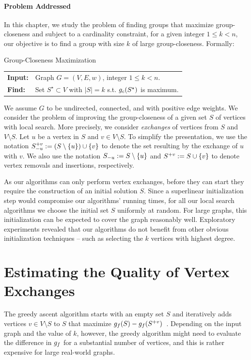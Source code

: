 \paragraph{Problem Addressed}
%
In this chapter, we study the problem of finding groups that maximize
group-closeness and subject to a cardinality constraint, \ie for a given
integer $1 \le k < n$, our objective is to find a group with size $k$ of large
group-closeness. Formally:

\begin{cproblem}{Group-Closeness Maximization}
\begin{tabular}{ll}
\textbf{Input:} & Graph $G = (V, E, w)$, integer $1 \le k < n$.\\
\textbf{Find:} & Set $S^\star \subset V$ with $|S| = k$ s.t. $g_c(S^\star)$ is maximum.
\end{tabular}
\end{cproblem}

We assume $G$ to be undirected, connected, and with positive edge weights.
We consider the problem of improving the group-closeness of a given
set $S$ of vertices with local search. More precisely, we consider
\emph{exchanges} of vertices from $S$ and $V \setminus S$. Let $u$ be a vertex
in $S$ and $v \in V \setminus S$. To simplify the presentation, we use the
notation $\Suv := (S \setminus \set{u}) \cup \set{v}$ to denote the set
resulting by the exchange of $u$ with $v$. We also use the
notation $\Su := S \setminus \set{u}$ and $\Sv := S \cup \set{v}$ to denote
vertex removals and insertions, respectively.

As our algorithms can only perform vertex exchanges, before they can start
they require the construction of an initial solution $S$. Since a superlinear
initialization step would compromise our algorithms' running times, for all our
local search algorithms we choose the initial set $S$ uniformly at random.
%
For large graphs, this initialization can be expected to cover the graph
reasonably well. Exploratory experiments revealed that our algorithms do not
benefit from other obvious initialization techniques -- such as selecting the
$k$ vertices with highest degree.


\section{Estimating the Quality of Vertex Exchanges}
\label{sec:lsh-gc-quality-vertex-exchanges}
%
The greedy ascent algorithm starts with an empty set $S$ and iteratively adds
vertices $v \in V \setminus S$ to $S$ that maximize
$g_f(S) - g_f(S^{+v})$~\cite{DBLP:conf/alenex/BergaminiGM18}.
Depending on the input graph and the value of $k$, however, the greedy algorithm
might need to evaluate the difference in $g_f$ for a substantial number
of vertices, and this is rather expensive for large real-world graphs.


